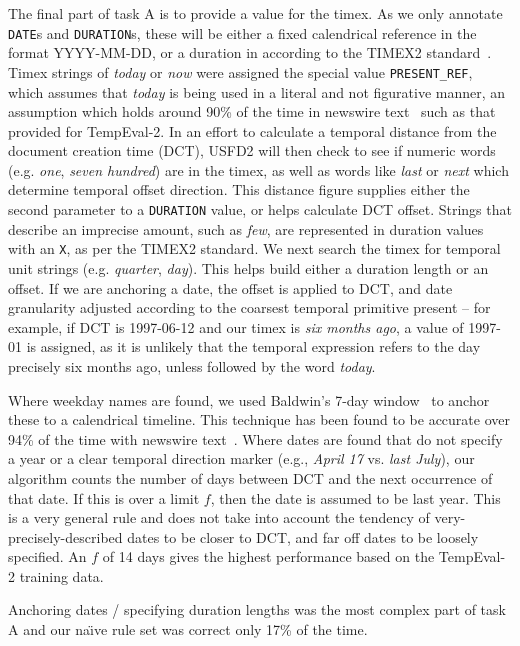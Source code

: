 \documentclass[11pt]{article}
\begin{document}
The final part of task A is to provide a value for the timex. As we only annotate {\tt DATE}s and {\tt DURATION}s, these will be either a fixed calendrical reference in the format YYYY-MM-DD, or a duration in according to the TIMEX2 standard~\cite{ferro2005tides}. Timex strings of \emph{today} or \emph{now} were assigned the special value {\tt PRESENT\_REF}, which assumes that \emph{today} is being used in a literal and not figurative manner, an assumption which holds around 90\% of the time in newswire text~\cite{ahn2005towards} such as that provided for TempEval-2. In an effort to calculate a temporal distance from the document creation time (DCT), USFD2 will then check to see if numeric words (e.g. \emph{one}, \emph{seven hundred}) are in the timex, as well as words like \emph{last} or \emph{next} which determine temporal offset direction. This distance figure supplies either the second parameter to a {\tt DURATION} value, or helps calculate DCT offset. Strings that describe an imprecise amount, such as \emph{few}, are represented in duration values with an {\tt X}, as per the TIMEX2 standard. We next search the timex for temporal unit strings (e.g. \emph{quarter}, \emph{day}). This helps build either a duration length or an offset. If we are anchoring a date, the offset is applied to DCT, and date granularity adjusted according to the coarsest temporal primitive present -- for example, if DCT is 1997-06-12 and our timex is \emph{six months ago}, a value of 1997-01 is assigned, as it is unlikely that the temporal expression refers to the day precisely six months ago, unless followed by the word \emph{today}.

Where weekday names are found, we used Baldwin's 7-day window~\cite{baldwin2002learning} to anchor these to a calendrical timeline. This technique has been found to be accurate over 94\% of the time with newswire text~\cite{mazur2008s}. Where dates are found that do not specify a year or a clear temporal direction marker (e.g., \emph{April 17} vs. \emph{last July}), our algorithm counts the number of days between DCT and the next occurrence of that date. If this is over a limit $f$, then the date is assumed to be last year. This is a very general rule and does not take into account the tendency of very-precisely-described dates to be closer to DCT, and far off dates to be loosely specified. An $f$ of 14 days gives the highest performance based on the TempEval-2 training data.

Anchoring dates / specifying duration lengths was the most complex part of task A and our na\"{\i}ve rule set was correct only 17\% of the time.
\end{document}
